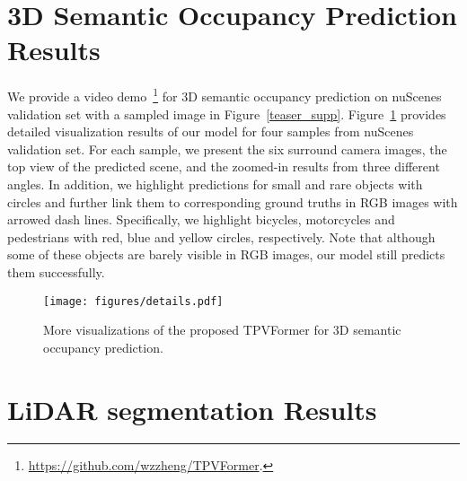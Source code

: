\documentclass[10pt,twocolumn,letterpaper]{article}
\begin{document}
\section{3D Semantic Occupancy Prediction Results} \label{app:occupancy}
We provide a video demo~\footnote{\url{https://github.com/wzzheng/TPVFormer}.} for 3D semantic occupancy prediction on nuScenes validation set with a sampled image in Figure~\ref{teaser_supp}.
Figure~\ref{fig: supp details} provides detailed visualization results of our model for four samples from nuScenes validation set.
For each sample, we present the six surround camera images, the top view of the predicted scene, and the zoomed-in results from three different angles. 
In addition, we highlight predictions for small and rare objects with circles and further link them to corresponding ground truths in RGB images with arrowed dash lines.
Specifically, we highlight bicycles, motorcycles and pedestrians with red, blue and yellow circles, respectively.
Note that although some of these objects are barely visible in RGB images, our model still predicts them successfully.


\begin{figure}[t]
\centering
\texttt{[image: figures/details.pdf]}
\vspace{-7mm}
\caption{More visualizations of the proposed TPVFormer for 3D semantic occupancy prediction.
}
\label{fig: supp details}
\vspace{-5mm}
\end{figure}

\section{LiDAR segmentation Results} \label{app:LidarSeg}
\end{document}
